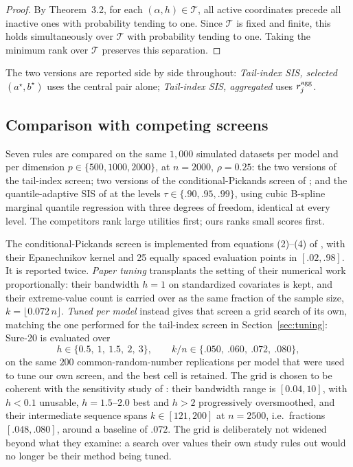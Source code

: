 \begin{proof}
By Theorem~3.2, for each $(\alpha,h)\in\mathcal T$, all active coordinates precede all inactive ones with probability tending to one. Since $\mathcal T$ is fixed and finite, this holds simultaneously over $\mathcal T$ with probability tending to one. Taking the minimum rank over $\mathcal T$ preserves this separation.
\end{proof}

The two versions are reported side by side throughout:
\emph{Tail-index SIS, selected $(a^\star,b^\star)$} uses the central
pair alone; \emph{Tail-index SIS, aggregated} uses $r_j^{\rm agg}$.

\subsection{Comparison with competing screens}\label{sec:comparison}

Seven rules are compared on the same $1{,}000$ simulated datasets per
model and per dimension $p\in\{500,1000,2000\}$, at $n=2000$,
$\rho=0.25$: the two versions of the tail-index screen; two versions of
the conditional-Pickands screen of \citet{yoshidaUmezu2026}; and the
quantile-adaptive SIS of \citet{heWangHong2013} at the levels
$\tau\in\{.90,.95,.99\}$, using cubic B-spline marginal quantile
regression with three degrees of freedom, identical at every level. The
competitors rank large utilities first; ours ranks small scores first.

The conditional-Pickands screen is implemented from equations (2)--(4)
of \citet{yoshidaUmezu2026}, with their Epanechnikov kernel and 25
equally spaced evaluation points in $[.02,.98]$. It is reported twice.
\emph{Paper tuning} transplants the setting of their numerical work
proportionally: their bandwidth $h=1$ on standardized covariates is
kept, and their extreme-value count is carried over as the same
fraction of the sample size, $k=\lfloor0.072\,n\rfloor$. \emph{Tuned per
model} instead gives that screen a grid search of its own, matching the
one performed for the tail-index screen in Section~\ref{sec:tuning}:
Sure-20 is evaluated over
\[
 h\in\{0.5,\ 1,\ 1.5,\ 2,\ 3\},
 \qquad
 k/n\in\{.050,\ .060,\ .072,\ .080\},
\]
on the same $200$ common-random-number replications per model that were
used to tune our own screen, and the best cell is retained. The grid is
chosen to be coherent with the sensitivity study of
\citet{yoshidaUmezu2026}: their bandwidth range is $[0.04,10]$, with
$h<0.1$ unusable, $h=1.5$--$2.0$ best and $h>2$ progressively
oversmoothed, and their intermediate sequence spans $k\in[121,200]$ at
$n=2500$, i.e.\ fractions $[.048,.080]$, around a baseline of $.072$. The
grid is deliberately not widened beyond what they examine: a search over
values their own study rules out would no longer be their method being
tuned.

